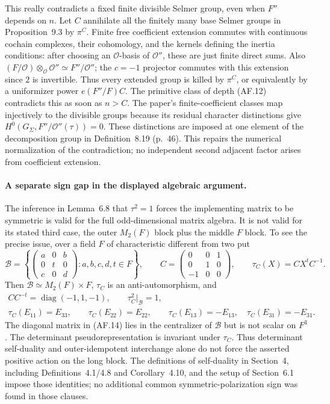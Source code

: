 This really contradicts a fixed finite divisible Selmer group, even
when $F''$ depends on $n$.  Let $C$ annihilate all the finitely many
base Selmer groups in Proposition~9.3 by $\pi^C$.  Finite free
coefficient extension commutes with continuous cochain complexes,
their cohomology, and the kernels defining the inertia conditions:
after choosing an $\mathcal O$-basis of $\mathcal O''$, these are
just finite direct sums.  Also
$(F/\mathcal O)\otimes_{\mathcal O}\mathcal O''
\simeq F''/\mathcal O''$; the $c=-1$ projector commutes with
this extension since $2$ is invertible.  Thus every extended group
is killed by $\pi^C$, or equivalently by a uniformizer power
$e(F''/F)C$.  The primitive class of depth (AF.12) contradicts this
as soon as $n>C$.  The paper's finite-coefficient classes map
injectively to the divisible groups because its residual character
distinctions give $H^0(G_\Sigma,F''/\mathcal O''(\tau))=0$.
These distinctions are imposed at one element of the decomposition
group in Definition~8.19 (p.~46).
This repairs the numerical normalization of the contradiction;
no independent second adjacent factor arises from coefficient
extension.

\paragraph{A separate sign gap in the displayed algebraic argument.}
The inference in Lemma~6.8 that $\tau^2=1$ forces the implementing
matrix to be symmetric is valid for the full odd-dimensional matrix
algebra.  It is not valid for its stated third case, the outer
$M_2(F)$ block plus the middle $F$ block.  To see the precise issue,
over a field $F$ of characteristic different from two put
\[
 \mathcal B=
 \left\{\begin{pmatrix}a&0&b\\0&t&0\\c&0&d\end{pmatrix}
           :a,b,c,d,t\in F\right\},\qquad
 C=\begin{pmatrix}0&0&1\\0&1&0\\-1&0&0\end{pmatrix},
 \qquad \tau_C(X)=CX^tC^{-1}.                                \tag{AF.13}
\]
Then $\mathcal B\simeq M_2(F)\times F$, $\tau_C$ is an
anti-automorphism, and
\[
 \begin{gathered}
 C C^{-t}=\operatorname{diag}(-1,1,-1),\qquad
 \tau_C^2|_{\mathcal B}=1,\\
 \tau_C(E_{11})=E_{33},\qquad \tau_C(E_{22})=E_{22},\qquad
 \tau_C(E_{13})=-E_{13},\quad \tau_C(E_{31})=-E_{31}.
 \end{gathered}                                               \tag{AF.14}
\]
The diagonal matrix in (AF.14) lies in the centralizer of
$\mathcal B$ but is not scalar on $F^3$.  The determinant
pseudorepresentation is invariant under $\tau_C$.  Thus
determinant self-duality and outer-idempotent interchange alone
do not force the asserted positive action on the long block.
The definitions of self-duality in Section~4, including
Definitions~4.1/4.8 and Corollary~4.10, and the setup of
Section~6.1 impose those identities; no additional common
symmetric-polarization sign was found in those clauses.

